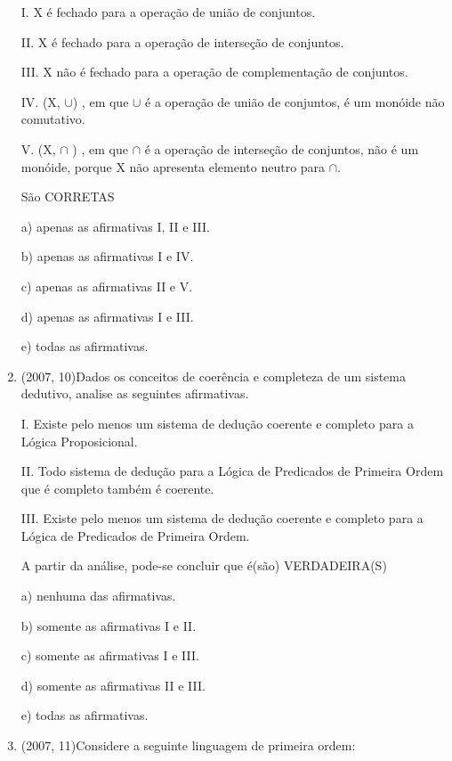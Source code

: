 \documentclass{article}
\begin{document}
\begin{enumerate}
I. X é fechado para a operação de união de conjuntos.

II. X é fechado para a operação de interseção de conjuntos.

III. X não é fechado para a operação de complementação de conjuntos.

IV. (X, $\cup$) , em que $\cup$ é a operação de união de conjuntos, é um monóide não comutativo.

V. (X, $\cap$ ) , em que $\cap$ é a operação de interseção de conjuntos, não é um monóide, porque X não apresenta elemento neutro para $\cap$.\newline

São CORRETAS\newline

a) apenas as afirmativas I, II e III.

b) apenas as afirmativas I e IV.

c) apenas as afirmativas II e V.

d) apenas as afirmativas I e III.

e) todas as afirmativas.\newline





\item(2007, 10)Dados os conceitos de coerência e completeza de um sistema dedutivo, analise
as seguintes afirmativas.

I. Existe pelo menos um sistema de dedução coerente e completo para a Lógica Proposicional.

II. Todo sistema de dedução para a Lógica de Predicados de Primeira Ordem que é completo também é coerente.

III. Existe pelo menos um sistema de dedução coerente e completo para a Lógica de Predicados de Primeira Ordem.

A partir da análise, pode-se concluir que é(são) VERDADEIRA(S)

a) nenhuma das afirmativas.

b) somente as afirmativas I e II.

c) somente as afirmativas I e III.

d) somente as afirmativas II e III.

e) todas as afirmativas.\newline



\item(2007, 11)Considere a seguinte linguagem de primeira ordem:


\end{enumerate}
\end{document}
